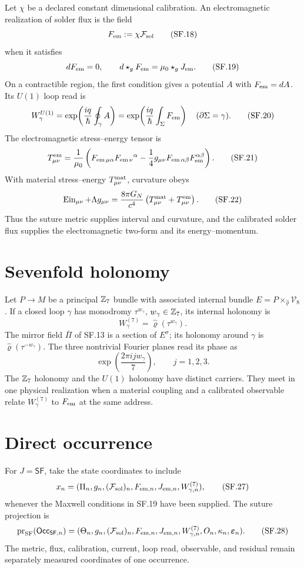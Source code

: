\documentclass[10pt]{article}
\newcommand{\hatrho}{\widehat\varrho}
\newcommand{\Fsol}{\mathcal F_{\rm sol}}
\begin{document}
Let $\chi$ be a declared constant dimensional calibration. An electromagnetic
realization of solder flux is the field
\[
F_{\rm em}:=\chi\Fsol
\tag{SF.18}
\]
when it satisfies
\[
dF_{\rm em}=0,
\qquad
d\star_gF_{\rm em}=\mu_0\star_gJ_{\rm em}.
\tag{SF.19}
\]
On a contractible region, the first condition gives a potential
$A$ with $F_{\rm em}=dA$. Its $U(1)$ loop read is
\[
W^{U(1)}_\gamma=
\exp\!\left(\frac{iq}{\hbar}\oint_\gamma A\right)
=\exp\!\left(\frac{iq}{\hbar}\int_\Sigma F_{\rm em}\right)
\quad(\partial\Sigma=\gamma).
\tag{SF.20}
\]
The electromagnetic stress--energy tensor is
\[
T^{\rm em}_{\mu\nu}=\frac1{\mu_0}
\left(F_{{\rm em}\,\mu\alpha}F_{\rm em\,\nu}{}^\alpha
-\frac14g_{\mu\nu}F_{{\rm em}\,\alpha\beta}
F_{\rm em}^{\alpha\beta}\right).
\tag{SF.21}
\]
With material stress--energy $T^{\rm mat}_{\mu\nu}$, curvature obeys
\[
\operatorname{Ein}_{\mu\nu}+\Lambda g_{\mu\nu}
=\frac{8\pi G_N}{c^4}
\left(T^{\rm mat}_{\mu\nu}+T^{\rm em}_{\mu\nu}\right).
\tag{SF.22}
\]
Thus the suture metric supplies interval and curvature, and the calibrated
solder flux supplies the electromagnetic two-form and its energy--momentum.

\section{Sevenfold holonomy}

Let $P\to M$ be a principal $\mathbb Z_7$ bundle with associated internal bundle
$E=P\times_{\hatrho}\mathcal V_8$. If a closed loop $\gamma$ has monodromy
$\tau^{w_\gamma}$, $w_\gamma\in\mathbb Z_7$, its internal holonomy is
\[
W^{(7)}_\gamma=\hatrho(\tau^{w_\gamma}).
\tag{SF.23}
\]
The mirror field $\bar\Pi$ of SF.13 is a section of $E^\sigma$; its holonomy
around $\gamma$ is $\hatrho(\tau^{-w_\gamma})$.
The three nontrivial Fourier planes read its phase as
\[
\exp\!\left(\frac{2\pi i j w_\gamma}{7}\right),
\qquad j=1,2,3.
\tag{SF.24}
\]
The $\mathbb Z_7$ holonomy and the $U(1)$ holonomy have distinct carriers. They
meet in one physical realization when a material coupling and a calibrated
observable relate $W^{(7)}_\gamma$ to $F_{\rm em}$ at the same address.

\section{Direct occurrence}


For $J=\mathsf{SF}$, take the state coordinates to include
\[
x_n=(\Pi_n,g_n,(\Fsol)_n,F_{{\rm em},n},J_{{\rm em},n},W^{(7)}_{\gamma,n}),
\tag{SF.27}
\]
whenever the Maxwell conditions in SF.19 have been supplied. The suture
projection is
\[
\operatorname{pr}_{\rm SF}(\mathsf{Occ}_{\mathsf{SF},n})
=(\Theta_n,g_n,(\Fsol)_n,F_{{\rm em},n},J_{{\rm em},n},
W^{(7)}_{\gamma,n},O_n,\kappa_n,\boldsymbol\varepsilon_n).
\tag{SF.28}
\]
The metric, flux, calibration, current, loop read, observable, and residual
remain separately measured coordinates of one occurrence.
\end{document}
